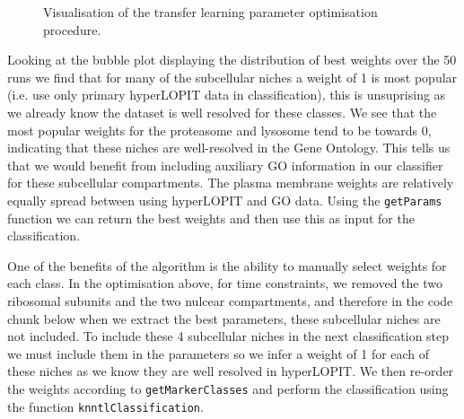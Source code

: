 \begin{figure}[!ht]
  \centering
\begin{knitrout}
\color{fgcolor}\begin{kframe}
\begin{alltt}
\end{alltt}


{\ttfamily\noindent\bfseries{}}\end{kframe}
\end{knitrout}
  \caption{Visualisation of the transfer learning parameter optimisation procedure.}
  \label{fig:plottl}
\end{figure}


Looking at the bubble plot displaying the distribution of best weights
over the 50 runs we find that for many of the subcellular niches a
weight of 1 is most popular (i.e. use only primary hyperLOPIT data in
classification), this is unsuprising as we already know the dataset is
well resolved for these classes. We see that the most popular weights
for the proteasome and lysosome tend to be towards 0, indicating that
these niches are well-resolved in the Gene Ontology. This tells us
that we would benefit from including auxiliary GO information in our
classifier for these subcellular compartments. The plasma membrane
weights are relatively equally spread between using hyperLOPIT and GO
data. Using the \texttt{getParams} function we can return the best
weights and then use this as input for the classification.

One of the benefits of the algorithm is the ability to manually select
weights for each class. In the optimisation above, for time
constraints, we removed the two ribosomal subunits and the two nulcear
compartments, and therefore in the code chunk below when we extract
the best parameters, these subcellular niches are not included. To
include these 4 subcellular niches in the next classification step we
must include them in the parameters so we infer a weight of 1 for each
of these niches as we know they are well resolved in hyperLOPIT. We
then re-order the weights according to \texttt{getMarkerClasses} and
perform the classification using the function
\texttt{knntlClassification}.

